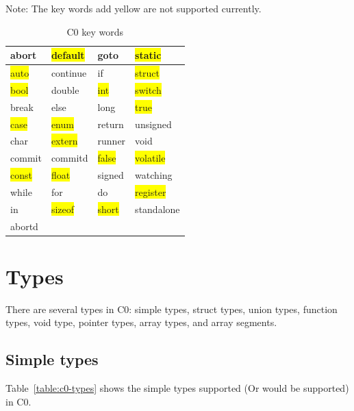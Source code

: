 \documentclass[a4paper]{article}
\begin{document}
\begin{table}[htbp]
\centering
\caption{C0 key words}
\begin{tablenotes}
\small
\centering
\item Note: The key words add yellow are not supported currently.
\end{tablenotes}
\begin{tabular}{|l|l|l|l|}
\hline
abort & \colorbox{yellow}{default} & goto & \colorbox{yellow}{static}\\
\hline
\colorbox{yellow}{auto} & continue & if & \colorbox{yellow}{struct}\\
\hline
\colorbox{yellow}{bool} & double & \colorbox{yellow}{int} & \colorbox{yellow}{switch}\\
\hline
break & else & long & \colorbox{yellow}{true}\\
\hline
\colorbox{yellow}{case} & \colorbox{yellow}{enum} & return & unsigned\\
\hline
char & \colorbox{yellow}{extern} & runner & void\\
\hline
commit & commitd & \colorbox{yellow}{false} & \colorbox{yellow}{volatile}\\
\hline
\colorbox{yellow}{const} & \colorbox{yellow}{float} & signed & watching\\
\hline
while & for & do & \colorbox{yellow}{register}\\
\hline
in & \colorbox{yellow}{sizeof} & \colorbox{yellow}{short} & standalone\\
\hline
abortd &  &  & \\
\hline
\end{tabular}
\label{table:key-words}
\end{table}

{\color{darkblue}\section{Types}}

There are several types in C0: simple types, struct types, union types, function types, void type, pointer types, array types, and array segments.

{\color{lightblue}\subsection{Simple types}}

Table~\ref{table:c0-types} shows the simple types supported (Or would be supported) in C0.
\end{document}
